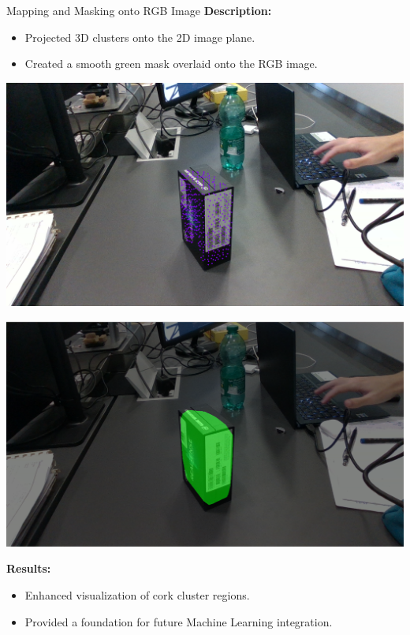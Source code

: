 \documentclass[10pt]{beamer}
\begin{document}
	
	\begin{frame}{Mapping and Masking onto RGB Image}
		\textbf{Description:}
		\begin{itemize}
			\item Projected 3D clusters onto the 2D image plane.
			\item Created a smooth green mask overlaid onto the RGB image.
		\end{itemize}
		\begin{minipage}{0.48\textwidth} %
			\centering
			\includegraphics[width=\textwidth]{img/points.png} %
			
		\end{minipage}
		\hfill %
		\begin{minipage}{0.48\textwidth} %
			\centering
			\includegraphics[width=\textwidth]{img/mask.png} %
		\end{minipage}
	
		\vspace{0.5cm} %
		
		\textbf{Results:}
		\begin{itemize}
			\item Enhanced visualization of cork cluster regions.
			\item Provided a foundation for future Machine Learning integration.
		\end{itemize}
	\end{frame}
\end{document}
